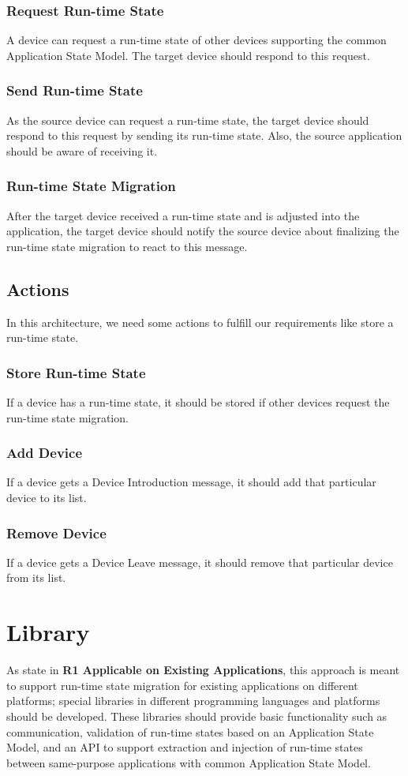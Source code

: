 \subsubsection{Request Run-time State}
A device can request a run-time state of other devices supporting the common Application State Model. The target device should respond to this request.

\subsubsection{Send Run-time State}
As the source device can request a run-time state, the target device should respond to this request by sending its run-time state. Also, the source application should be aware of receiving it.

\subsubsection{Run-time State Migration}
After the target device received a run-time state and is adjusted into the application, the target device should notify the source device about finalizing the run-time state migration to react to this message.

\subsection{Actions}
In this architecture, we need some actions to fulfill our requirements like store a run-time state.

\subsubsection{Store Run-time State}
If a device has a run-time state, it should be stored if other devices request the run-time state migration.

\subsubsection{Add Device}
If a device gets a Device Introduction message, it should add that particular device to its list.

\subsubsection{Remove Device}
If a device gets a Device Leave message, it should remove that particular device from its list.

\section{Library}
As state in \textbf{R1 Applicable on Existing Applications}, this approach is meant to support run-time state migration for existing applications on different platforms; special libraries in different programming languages and platforms should be developed. 
These libraries should provide basic functionality such as communication, validation of run-time states based on an Application State Model, and an API to support extraction and injection of run-time states between same-purpose applications with common Application State Model.

